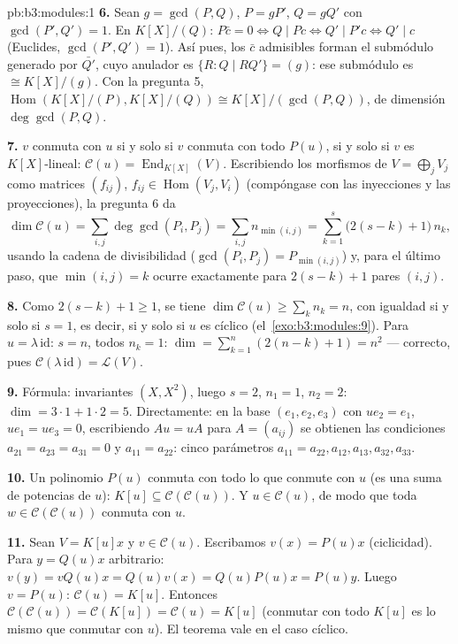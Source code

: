 \begin{solution}{pb:b3:modules:1}
\textbf{6.} Sean $g = \gcd(P, Q)$, $P = gP'$, $Q = gQ'$ con
$\gcd(P', Q') = 1$. En $K[X]/(Q)$: $P\bar c = 0 \iff Q \mid Pc
\iff Q' \mid P'c \iff Q' \mid c$ (Euclides, $\gcd(P', Q') = 1$). Así
pues, los $\bar c$ admisibles forman el submódulo generado por
$\bar{Q'}$, cuyo anulador es $\{R : Q \mid RQ'\} = (g)$: ese submódulo
es $\cong K[X]/(g)$. Con la pregunta 5,
$\operatorname{Hom}(K[X]/(P), K[X]/(Q)) \cong K[X]/(\gcd(P,Q))$,
de dimensión $\deg\gcd(P,Q)$.

\textbf{7.} $v$ conmuta con $u$ si y solo si $v$ conmuta con todo
$P(u)$, si y solo si $v$ es $K[X]$-lineal: $\mathcal C(u) =
\operatorname{End}_{K[X]}(V)$. Escribiendo los morfismos de $V =
\bigoplus_j V_j$ como matrices $(f_{ij})$, $f_{ij} \in
\operatorname{Hom}(V_j, V_i)$ (compóngase con las inyecciones y las
proyecciones), la pregunta 6 da
\[
\dim \mathcal C(u) = \sum_{i,j} \deg\gcd(P_i, P_j)
= \sum_{i,j} n_{\min(i,j)}
= \sum_{k=1}^{s} \bigl(2(s - k) + 1\bigr)\,n_k ,
\]
usando la cadena de divisibilidad ($\gcd(P_i, P_j) =
P_{\min(i,j)}$) y, para el último paso, que $\min(i,j) = k$ ocurre
exactamente para $2(s - k) + 1$ pares $(i, j)$.

\textbf{8.} Como $2(s-k)+1 \geq 1$, se tiene $\dim\mathcal C(u) \geq
\sum_k n_k = n$, con igualdad si y solo si $s = 1$, es decir, si y solo
si $u$ es cíclico (el~\cref{exo:b3:modules:9}). Para
$u = \lambda\,\mathrm{id}$: $s = n$, todos $n_k = 1$:
$\dim = \sum_{k=1}^n (2(n-k)+1) = n^2$ --- correcto, pues
$\mathcal C(\lambda\,\mathrm{id}) = \mathcal
L(V)$.

\textbf{9.} Fórmula: invariantes $(X, X^2)$, luego $s = 2$, $n_1 =
1$, $n_2 = 2$: $\dim = 3\cdot1 + 1\cdot2 = 5$. Directamente: en la base
$(e_1, e_2, e_3)$ con $u e_2 = e_1$, $ue_1 = ue_3 = 0$, escribiendo
$Au = uA$ para $A = (a_{ij})$ se obtienen las condiciones
$a_{21} = a_{23} = a_{31} = 0$ y $a_{11} = a_{22}$: cinco parámetros
$a_{11}{=}a_{22}, a_{12}, a_{13}, a_{32}, a_{33}$.

\textbf{10.} Un polinomio $P(u)$ conmuta con todo lo que conmute con $u$
(es una suma de potencias de $u$): $K[u]
\subseteq \mathcal C(\mathcal C(u))$. Y $u \in \mathcal C(u)$, de modo
que toda $w \in \mathcal C(\mathcal C(u))$ conmuta con $u$.

\textbf{11.} Sean $V = K[u]x$ y $v \in \mathcal C(u)$. Escribamos
$v(x) = P(u)x$ (ciclicidad). Para $y = Q(u)x$ arbitrario: $v(y) =
vQ(u)x = Q(u)v(x) = Q(u)P(u)x = P(u)y$. Luego $v = P(u)$: $\mathcal
C(u) = K[u]$. Entonces $\mathcal C(\mathcal C(u)) = \mathcal
C(K[u]) = \mathcal C(u) = K[u]$ (conmutar con todo $K[u]$ es lo mismo
que conmutar con $u$). El teorema vale en el caso cíclico.


\end{solution}
